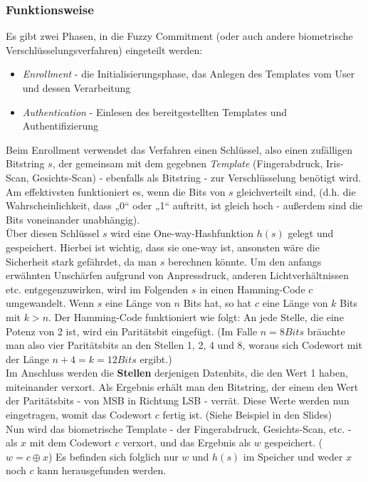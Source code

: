 \documentclass[12pt,a4paper]{article}
\begin{document}
\subsubsection{Funktionsweise}
Es gibt zwei Phasen, in die Fuzzy Commitment (oder auch andere biometrische Verschlüsselungsverfahren) eingeteilt werden: 
\begin{itemize}
\item \textit{Enrollment} - die Initialisierungsphase, das Anlegen des Templates vom User und dessen Verarbeitung
\item \textit{Authentication} - Einlesen des bereitgestellten Templates und Authentifizierung
\end{itemize}
Beim Enrollment verwendet das Verfahren einen Schlüssel, also einen zufälligen Bitstring $s$, der gemeinsam mit dem gegebnen \textit{Template} (Fingerabdruck, Iris-Scan, Gesichts-Scan) - ebenfalls als Bitstring - zur Verschlüsselung benötigt wird.
Am effektivsten funktioniert es, wenn die Bits von $s$ gleichverteilt sind, (d.h. die Wahrscheinlichkeit, dass „0“ oder „1“ auftritt, ist gleich hoch - außerdem sind die Bits voneinander unabhängig). \\
Über diesen Schlüssel $s$ wird eine One-way-Hashfunktion $h(s)$ gelegt und gespeichert. Hierbei ist wichtig, dass sie one-way ist, ansonsten wäre die Sicherheit stark gefährdet, da man $s$ berechnen könnte.
Um den anfangs erwähnten Unschärfen aufgrund von Anpressdruck, anderen Lichtverhältnissen etc. entgegenzuwirken, wird im Folgenden $s$ in einen Hamming-Code $c$ umgewandelt. Wenn $s$ eine Länge von $n$ Bits hat, so hat $c$ eine Länge von $k$ Bits mit $k > n$. Der Hamming-Code funktioniert wie folgt: An jede Stelle, die eine Potenz von 2 ist, wird ein Paritätsbit eingefügt. (Im Falle $n = 8 Bits$ bräuchte man also vier Paritätsbits an den Stellen 1, 2, 4 und 8, woraus sich Codewort mit der Länge $n + 4 = k = 12 Bits$ ergibt.) \\
Im Anschluss werden die \textbf{Stellen} derjenigen Datenbits, die den Wert 1 haben, miteinander verxort. Als Ergebnis erhält man den Bitstring, der einem den Wert der Paritätsbits - von MSB in Richtung LSB - verrät. Diese Werte werden nun eingetragen, womit das Codewort $c$ fertig ist. (Siehe Beispiel in den Slides) \\
Nun wird das biometrische Template - der Fingerabdruck, Gesichts-Scan, etc. - als $x$ mit dem Codewort $c$ verxort, und das Ergebnis als $w$ gespeichert. ($w = c \oplus x$) Es befinden sich folglich nur $w$ und $h(s)$ im Speicher und weder $x$ noch $c$ kann herausgefunden werden. \\
\end{document}
